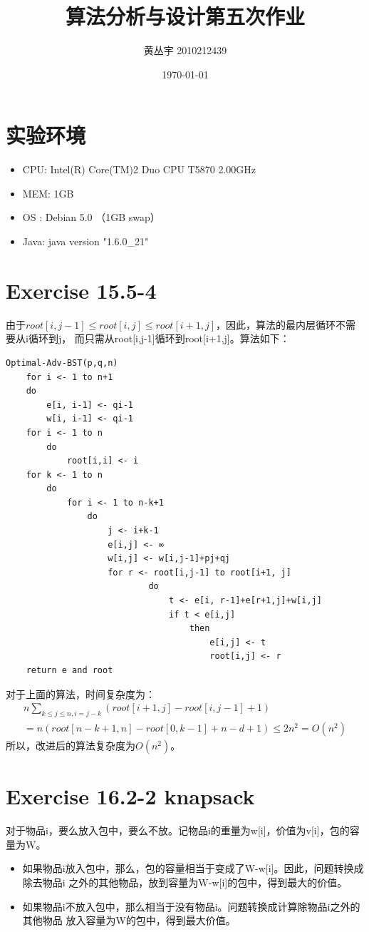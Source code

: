 \documentclass[a4paper, 11pt]{article}
\theoremstyle{plain}\newtheorem{Lemma}{定理}
\begin{document}
\title{{\Huge 算法分析与设计第五次作业\\}}
\author{黄丛宇 2010212439}
\date{\today}

\maketitle

\section{实验环境}
\begin{itemize}
	\item CPU: Intel(R) Core(TM)2 Duo CPU T5870 2.00GHz
	\item MEM: 1GB
	\item OS : Debian 5.0 （1GB swap）
	\item Java: java version "1.6.0\_21"
\end{itemize}
\section{Exercise 15.5-4}
由于$root[i,j-1]\le root[i,j]\le root[i+1,j]$，因此，算法的最内层循环不需要从i循环到j，
而只需从root[i,j-1]循环到root[i+1,j]。算法如下：
\begin{verbatim}
Optimal-Adv-BST(p,q,n)
    for i <- 1 to n+1
    do
        e[i, i-1] <- qi-1
        w[i, i-1] <- qi-1
    for i <- 1 to n
        do 
            root[i,i] <- i
    for k <- 1 to n
        do
            for i <- 1 to n-k+1
                do
                    j <- i+k-1
                    e[i,j] <- ∞
                    w[i,j] <- w[i,j-1]+pj+qj
                    for r <- root[i,j-1] to root[i+1, j]
                            do
                                t <- e[i, r-1]+e[r+1,j]+w[i,j]
                                if t < e[i,j]
                                    then 
                                        e[i,j] <- t
                                        root[i,j] <- r
    return e and root
\end{verbatim}

对于上面的算法，时间复杂度为：
\begin{align*}
	n\sum_{k \le j \le n, i=j-k}^{}(root[i+1,j]-root[i,j-1]+1)\\
	=n(root[n-k+1,n]-root[0,k-1]+n-d+1)
	\le 2n^2
	=O(n^2)
\end{align*}  	
所以，改进后的算法复杂度为$O(n^2)$。


\section{Exercise 16.2-2 knapsack}
对于物品i，要么放入包中，要么不放。记物品i的重量为w[i]，价值为v[i]，包的容量为W。
\begin{itemize}
	\item 如果物品i放入包中，那么，包的容量相当于变成了W-w[i]。因此，问题转换成除去物品i
		之外的其他物品，放到容量为W-w[i]的包中，得到最大的价值。
	\item 如果物品i不放入包中，那么相当于没有物品i。问题转换成计算除物品i之外的其他物品
		放入容量为W的包中，得到最大价值。
\end{itemize}
\end{document}

